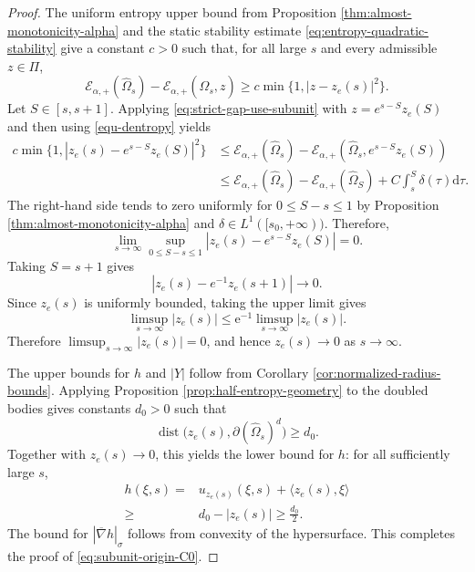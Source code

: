 \documentclass[11pt, reqno]{amsart}
\theoremstyle{remark}
\theoremstyle{definition}
\numberwithin{equation}{section}
\DeclareMathOperator{\dist}{dist}
\newcommand{\PiH}{\Pi}
\newcommand{\cE}{\mathcal E}
\begin{document}
\begin{proof}
	The uniform entropy upper bound from Proposition
	\ref{thm:almost-monotonicity-alpha} and the static stability estimate
	\eqref{eq:entropy-quadratic-stability} give a constant $c>0$ such that, for
	all large $s$ and every admissible $z\in\PiH$,
	\begin{equation}\label{eq:strict-gap-use-subunit}
		\cE_{\alpha,+}(\widehat\Omega_s)
		-\cE_{\alpha,+}(\widehat\Omega_s,z)
		\ge c\min\{1,|z-z_e(s)|^2\} .
	\end{equation}
	Let $S\in[s,s+1]$.  Applying \eqref{eq:strict-gap-use-subunit} with $z=e^{s-S}z_e(S)$ and then using \eqref{equ-dentropy} yields
	\begin{equation*}
		\begin{aligned}
			c\min\{1,|z_e(s)-e^{s-S}z_e(S)|^2\}
			&\le \cE_{\alpha,+}(\widehat\Omega_s)
			-\cE_{\alpha,+}(\widehat\Omega_s,e^{s-S}z_e(S)) \\
			&\le \cE_{\alpha,+}(\widehat\Omega_s)
			-\cE_{\alpha,+}(\widehat\Omega_S)
			+C\int_s^S\delta(\tau)\mathrm{d}\tau.
		\end{aligned}
	\end{equation*}
	The right-hand side tends to zero uniformly for $0\le S-s\le1$ by Proposition \ref{thm:almost-monotonicity-alpha} and $\delta\in L^1([s_0,+\infty))$.  Therefore,
	\begin{equation*}
		\lim\limits_{s\to\infty} \sup_{0\le S-s\le1}
		|z_e(s)-e^{s-S}z_e(S)|=0 .
	\end{equation*}
	Taking $S=s+1$ gives
	\begin{equation}\label{eq:ze-unstable-recurrence}
    |z_e(s)-e^{-1}z_e(s+1)|\to 0.
	\end{equation}
    Since $z_e(s)$ is uniformly bounded, taking the upper limit gives
    \begin{equation*}
        \limsup\limits_{s\to\infty}|z_e(s)| \leq \mathrm{e}^{-1} \limsup\limits_{s\to\infty} |z_e(s)|.
    \end{equation*}
    Therefore $\limsup_{s\to\infty}|z_e(s)|=0$, and hence $z_e(s)\to 0$ as $s\to\infty$.
    
	The upper bounds for $h$ and $|Y|$ follow from Corollary \ref{cor:normalized-radius-bounds}. Applying
	Proposition \ref{prop:half-entropy-geometry} to the doubled bodies gives
	constants $d_0>0$ such that
	\begin{equation*}
		\dist\big(z_e(s),\partial(\widehat\Omega_s)^d\big)\ge d_0.
	\end{equation*}
	Together with $z_e(s)\to0$, this yields the lower bound for $h$: for all sufficiently large $s$,
	\begin{align*}
		h(\xi,s)
		=&u_{z_e(s)}(\xi,s)+\langle z_e(s),\xi\rangle \\
		\ge &d_0-|z_e(s)|
		\ge \frac{d_0}{2}.
	\end{align*}
	The bound for $|\overline{\nabla}h|_{\sigma}$ follows from convexity of the hypersurface. This completes the proof of \eqref{eq:subunit-origin-C0}.
\end{proof}
\end{document}

